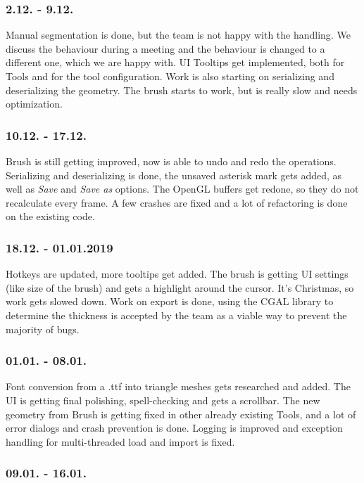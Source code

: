 \subsubsection{2.12. - 9.12.}

Manual segmentation is done, but the team is not happy with the handling. We discuss the behaviour during a meeting and the behaviour is changed to a different one, which we are happy with. UI Tooltips get implemented, both for Tools and for the tool configuration. Work is also starting on serializing and deserializing the geometry. The brush starts to work, but is really slow and needs optimization.

\subsubsection{10.12. - 17.12.}

Brush is still getting improved, now is able to undo and redo the operations. Serializing and deserializing is done, the unsaved asterisk mark gets added, as well as \textit{Save} and \textit{Save as} options. The OpenGL buffers get redone, so they do not recalculate every frame. A few crashes are fixed and a lot of refactoring is done on the existing code.

\subsubsection{18.12. - 01.01.2019}

Hotkeys are updated, more tooltips get added. The brush is getting UI settings (like size of the brush) and gets a highlight around the cursor. It's Christmas, so work gets slowed down. Work on export is done, using the CGAL library to determine the thickness is accepted by the team as a viable way to prevent the majority of bugs.

\subsubsection{01.01. - 08.01.}

Font conversion from a .ttf into triangle meshes gets researched and added. The UI is getting final polishing, spell-checking and gets a scrollbar. The new geometry from Brush is getting fixed in other already existing Tools, and a lot of error dialogs and crash prevention is done. Logging is improved and exception handling for multi-threaded load and import is fixed.

\subsubsection{09.01. - 16.01.}

